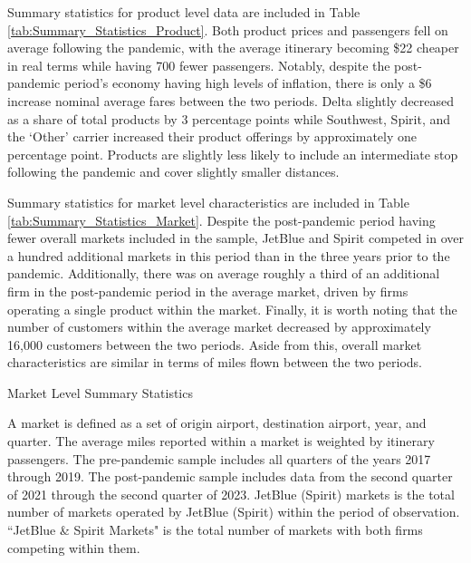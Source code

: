 \documentclass{article}
\begin{document}
    Summary statistics for product level data are included in Table \ref{tab:Summary_Statistics_Product}. Both product prices and passengers fell on average following the pandemic, with the average itinerary becoming \$22 cheaper in real terms while having 700 fewer passengers. Notably, despite the post-pandemic period's economy having high levels of inflation, there is only a \$6 increase nominal average fares between the two periods.  Delta slightly decreased as a share of total products by 3 percentage points while Southwest, Spirit, and the `Other' carrier increased their product offerings by approximately one percentage point. Products are slightly less likely to include an intermediate stop following the pandemic and cover slightly smaller distances. 

    Summary statistics for market level characteristics are included in Table \ref{tab:Summary_Statistics_Market}. Despite the post-pandemic period having fewer overall markets included in the sample, JetBlue and Spirit competed in over a hundred additional markets in this period than in the three years prior to the pandemic. Additionally, there was on average roughly a third of an additional firm in the post-pandemic period in the average market, driven by firms operating a single product within the market. Finally, it is worth noting that the number of customers within the average market decreased by approximately 16,000 customers between the two periods. Aside from this, overall market characteristics are similar in terms of miles flown  between the two periods. 

    \begin{table}
        \caption{Market Level Summary Statistics}
        \label{tab:Summary_Statistics_Market}
                \vspace{-15mm}
\begin{center}
            
            \footnotesize{A market is defined as a set of origin airport, destination airport, year, and quarter. The average miles reported within a market is weighted by itinerary passengers. The pre-pandemic sample includes all quarters of the years 2017 through 2019. The post-pandemic sample includes data from the second quarter of 2021 through the second quarter of 2023. JetBlue (Spirit) markets is the total number of markets operated by JetBlue (Spirit) within the period of observation. ``JetBlue \& Spirit Markets" is the total number of markets with both firms competing within them.}

\end{center}
    \end{table}
\end{document}
